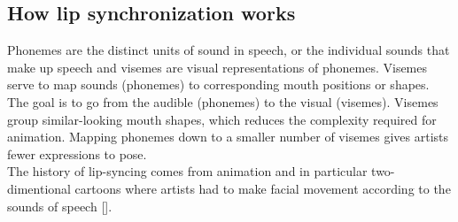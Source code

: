 \documentclass[12pt]{article}
\begin{document}
\subsection{How lip synchronization works}
Phonemes are the distinct units of sound in speech, or the individual sounds that make up speech and visemes are visual representations of phonemes. Visemes serve to map sounds (phonemes) to corresponding mouth positions or shapes. The goal is to go from the audible (phonemes) to the visual (visemes). Visemes group similar-looking mouth shapes, which reduces the complexity required for animation. Mapping phonemes down to a smaller number of visemes gives artists fewer expressions to pose.\\
The history of lip-syncing comes from animation and in particular two-dimentional cartoons where artists had to make facial movement according to the sounds of speech [\cite{game-lipsynch}].
\end{document}
